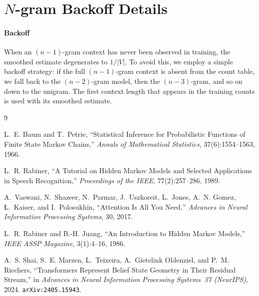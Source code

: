\documentclass[11pt]{article}
\begin{document}
\appendix

\section{$N$-gram Backoff Details}\label{app:ngram-details}

\paragraph{Backoff}
When an $(n{-}1)$-gram context has never been observed in training, the smoothed estimate degenerates to $1/|V|$.  To avoid this, we employ a simple backoff strategy: if the full $(n{-}1)$-gram context is absent from the count table, we fall back to the $(n{-}2)$-gram model, then the $(n{-}3)$-gram, and so on down to the unigram.  The first context length that appears in the training counts is used with its smoothed estimate.

\begin{thebibliography}{9}

L.~E. Baum and T.~Petrie,
``Statistical Inference for Probabilistic Functions of Finite State
Markov Chains,''
\emph{Annals of Mathematical Statistics}, 37(6):1554--1563, 1966.

L.~R. Rabiner,
``A Tutorial on Hidden Markov Models and Selected Applications in
Speech Recognition,''
\emph{Proceedings of the IEEE}, 77(2):257--286, 1989.

A.~Vaswani, N.~Shazeer, N.~Parmar, J.~Uszkoreit, L.~Jones,
A.~N. Gomez, \L.~Kaiser, and I.~Polosukhin,
``Attention Is All You Need,''
\emph{Advances in Neural Information Processing Systems}, 30, 2017.

L.~R. Rabiner and B.-H. Juang,
``An Introduction to Hidden Markov Models,''
\emph{IEEE ASSP Magazine}, 3(1):4--16, 1986.

A.~S. Shai, S.~E. Marzen, L.~Teixeira, A.~Gietelink Oldenziel,
and P.~M. Riechers,
``Transformers Represent Belief State Geometry in Their Residual Stream,''
in \emph{Advances in Neural Information Processing Systems~37 (NeurIPS)}, 2024.
\texttt{arXiv:2405.15943}.

\end{thebibliography}
\end{document}
